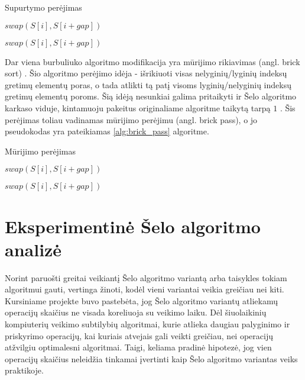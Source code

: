 \documentclass{VUMIFInfBakalaurinis}
\begin{document}
\begin{algorithm}[H]
  \caption{Supurtymo perėjimas}\label{alg:shake_pass}
  \begin{algorithmic}[1]
        \State $swap(S[i], S[i+gap])$
      \EndIf
    \EndFor

        \State $swap(S[i], S[i+gap])$
      \EndIf
    \EndFor
  \end{algorithmic}
\end{algorithm}

Dar viena burbuliuko algoritmo modifikacija yra mūrijimo rikiavimas (angl. brick sort) \cite{habermann1972parallel}.
Šio algoritmo perėjimo idėja - išrikiuoti visas nelyginių/lyginių indeksų gretimų elementų poras,
o tada atlikti tą patį visoms lyginių/nelyginių indeksų gretimų elementų poroms.
Šią idėją nesunkiai galima pritaikyti ir Šelo algoritmo karkaso viduje, kintamuoju pakeitus originaliame algoritme taikytą tarpą $1$ \cite{lemke1994performance}.
Šis perėjimas toliau vadinamas mūrijimo perėjimu (angl. brick pass), o jo pseudokodas yra pateikiamas \ref{alg:brick_pass} algoritme.

\begin{algorithm}[H]
  \caption{Mūrijimo perėjimas}\label{alg:brick_pass}
  \begin{algorithmic}[1]
        \State $swap(S[i], S[i+gap])$
      \EndIf
    \EndFor

        \State $swap(S[i], S[i+gap])$
      \EndIf
    \EndFor
  \end{algorithmic}
\end{algorithm}

\section{Eksperimentinė Šelo algoritmo analizė}

Norint paruošti greitai veikiantį Šelo algoritmo variantą arba taisykles tokiam algoritmui gauti, vertinga žinoti, kodėl vieni variantai veikia greičiau nei kiti.
Kursiniame projekte buvo pastebėta, jog Šelo algoritmo variantų atliekamų operacijų skaičius ne visada koreliuoja su veikimo laiku.
Dėl šiuolaikinių kompiuterių veikimo subtilybių algoritmai, kurie atlieka daugiau palyginimo ir priskyrimo operacijų,
kai kuriais atvejais gali veikti greičiau, nei operacijų atžvilgiu optimalesni algoritmai.
Taigi, keliama pradinė hipotezė, jog vien operacijų skaičius neleidžia tinkamai įvertinti kaip Šelo algoritmo variantas veiks praktikoje.
\end{document}
